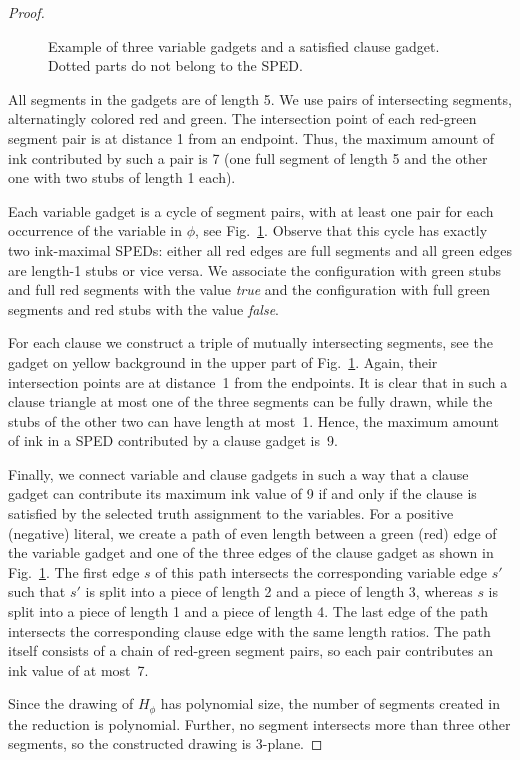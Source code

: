 \documentclass[a4paper, USenglish]{llncs}
\begin{document}
\begin{proof}
\begin{figure}
			\caption{Example of three variable gadgets and a satisfied clause gadget. Dotted parts do not belong to the SPED.}
			\label{fig:gadget_connection}
		\end{figure}
		All segments in the gadgets are of length 5.
		We use pairs of intersecting segments, alternatingly colored red and green.
		The intersection point of each red-green segment pair is at distance 1 from an endpoint.
		Thus, the maximum amount of ink contributed by such a pair is 7 (one full segment of length 5 and the other one with two stubs of length 1 each).
		
		Each variable gadget is a cycle of segment pairs, with at least one pair for each occurrence of the variable in $\phi$, see Fig.~\ref{fig:gadget_connection}. 
		Observe that this cycle has exactly two ink-maximal SPEDs: either all red edges are full segments and all green edges are length-1 stubs or vice versa.
		We associate the configuration with green stubs and full red segments with the value \emph{true} and the configuration with full green segments and red stubs with the value \emph{false}.
		
		For each clause we construct a triple of mutually intersecting segments, see the gadget on yellow background in the upper part of Fig.~\ref{fig:gadget_connection}.
		Again, their intersection points are at distance~1 from the endpoints.
		It is clear that in such a clause triangle at most one of the three segments can be fully drawn, while the stubs of the other two can have length at most~1.
		Hence, the maximum amount of ink in a SPED contributed by a clause gadget is~9.
		
		Finally, we connect variable and clause gadgets in such a way that a clause gadget can contribute its maximum ink value of 9 if and only if the clause is satisfied by the selected truth assignment to the variables.
		For a positive (negative) literal, we create a path of even length between a green (red) edge of the variable gadget and one of the three edges of the clause gadget as shown in Fig.~\ref{fig:gadget_connection}.
		The first edge $s$ of this path intersects the corresponding variable edge $s'$ such that $s'$ is split into a piece of length 2 and a piece of length 3, whereas $s$ is split into a piece of length 1 and a piece of length 4.
		The last edge of the path intersects the corresponding clause edge with the same length ratios.
		The path itself consists of a chain of red-green segment pairs, so each pair contributes an ink value of at most~7.
		
		Since the drawing of $H_\phi$ has polynomial size, the number of segments created in the reduction is polynomial. 
		Further, no segment intersects more than three other segments, so the constructed drawing is 3-plane. 
		

\end{proof}
\end{document}

